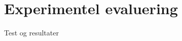 \documentclass[smaller]{beamer}
\newcommand{\vertex}{\node[vertex]}
\begin{document}
% 
% 
% 


\section{Experimentel evaluering}
\begin{frame}
 Test og resultater
\end{frame}
\end{document}
